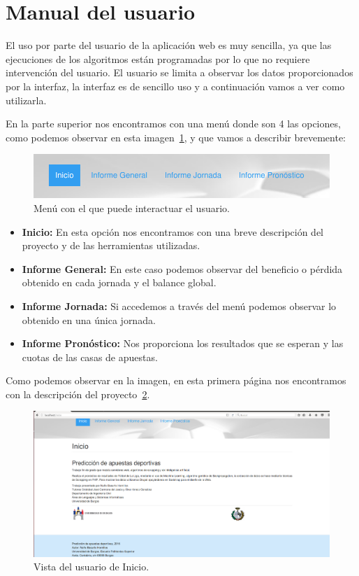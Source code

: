 \section{Manual del usuario}
El uso por parte del usuario de la aplicación web es muy sencilla, ya que las ejecuciones de los algoritmos están programadas por lo que no requiere intervención del usuario. El usuario se limita a observar los datos proporcionados por la interfaz, la interfaz es de sencillo uso y a continuación vamos a ver como utilizarla.

En la parte superior nos encontramos con una menú donde son 4 las opciones, como podemos observar en esta imagen~\ref{fig:MenuDru}, y que vamos a describir brevemente:
\begin{figure}
\centering
\includegraphics[width=.9\textwidth]{img/drupal_menu}
\caption{Menú con el que puede interactuar el usuario.}
\label{fig:MenuDru}
\end{figure}

\begin{itemize}
\item \textbf{Inicio: } En esta opción nos encontramos con una breve descripción del proyecto y de las herramientas utilizadas.
\item \textbf{Informe General: } En este caso podemos observar del beneficio o pérdida obtenido en cada jornada y el balance global.
\item \textbf{Informe Jornada: } Si accedemos a través del menú podemos observar lo obtenido en una única jornada.
\item \textbf{Informe Pronóstico: } Nos proporciona los resultados que se esperan y las cuotas de las casas de apuestas.
\end{itemize}

Como podemos observar en la imagen, en esta primera página nos encontramos con la descripción del proyecto~\ref{fig:IniDruUser}.

\begin{figure}
\centering
\includegraphics[width=.9\textwidth]{img/drupal_inicio_usuario}
\caption{Vista del usuario de Inicio.}
\label{fig:IniDruUser}
\end{figure}

